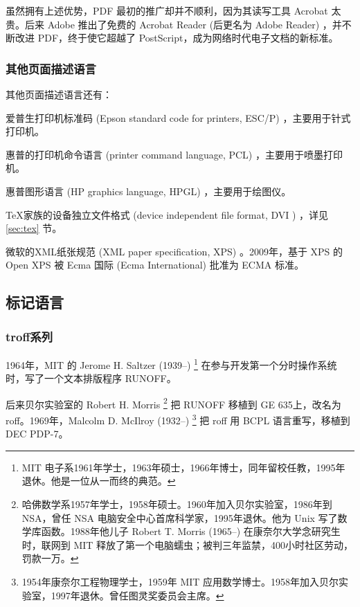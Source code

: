 虽然拥有上述优势，PDF 最初的推广却并不顺利，因为其读写工具 Acrobat 太贵。后来 Adobe 推出了免费的 Acrobat Reader (后更名为 Adobe Reader) ，并不断改进 PDF，终于使它超越了 PostScript，成为网络时代电子文档的新标准。

\subsubsection{其他页面描述语言}

其他页面描述语言还有：
\begin{compactitem}
   \item 爱普生\indexEpson{}打印机标准码 (Epson standard code for printers, ESC/P) ，主要用于针式打印机。
   \item 惠普\indexHP{}的打印机命令语言 (printer command language, PCL) ，主要用于喷墨打印机。
   \item 惠普图形语言 (HP graphics language, HPGL) ，主要用于绘图仪。
   \item \TeX 家族的设备独立文件格式 (device independent file format,  DVI ) ，详见 \ref{sec:tex} 节。
   \item 微软\indexMSFT 的XML纸张规范 (XML paper specification, XPS) 。2009年，基于 XPS 的 Open XPS 被 Ecma 国际 (Ecma International)\indexECMA{} 批准为 ECMA 标准。
\end{compactitem}

\subsection{标记语言}

\subsubsection{troff系列}

1964年，MIT 的 Jerome H. Saltzer (1939--)\indexSaltzer{} \footnote{MIT 电子系1961年学士，1963年硕士，1966年博士，同年留校任教，1995年退休。他是一位从一而终的典范。} 在参与开发第一个分时操作系统时，写了一个文本排版程序 RUNOFF。

后来贝尔实验室\indexBell 的 Robert H. Morris\indexMorris{} \footnote{哈佛数学系1957年学士，1958年硕士。1960年加入贝尔实验室，1986年到 NSA，曾任 NSA 电脑安全中心首席科学家，1995年退休。他为 Unix 写了数学库函数。1988年他儿子 Robert T. Morris (1965--) 在康奈尔大学念研究生时，联网到 MIT 释放了第一个电脑蠕虫；被判三年监禁，400小时社区劳动，罚款一万。} 把 RUNOFF 移植到 GE 635上，改名为 roff。1969年，Malcolm D. McIlroy (1932--)\indexMcIlroy{} \footnote{1954年康奈尔工程物理学士，1959年 MIT 应用数学博士。1958年加入贝尔实验室，1997年退休。曾任图灵奖委员会主席。} 把 roff 用 BCPL 语言重写，移植到 DEC\indexDEC{} PDP-7。

